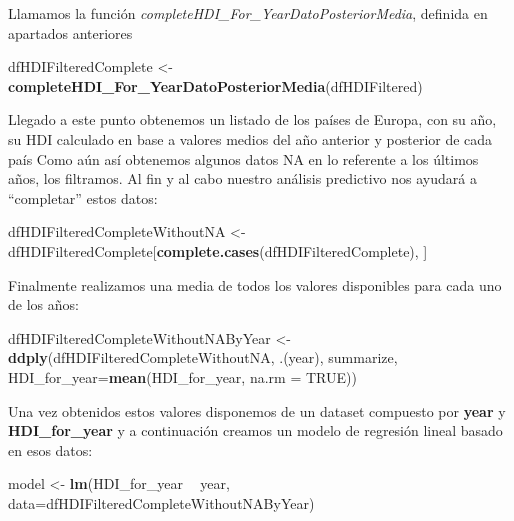 \documentclass[]{article}
\newenvironment{Shaded}{\begin{snugshade}}{\end{snugshade}}
\newcommand{\DataTypeTok}[1]{\textcolor[rgb]{0.13,0.29,0.53}{#1}}
\newcommand{\KeywordTok}[1]{\textcolor[rgb]{0.13,0.29,0.53}{\textbf{#1}}}
\newcommand{\NormalTok}[1]{#1}
\newcommand{\OperatorTok}[1]{\textcolor[rgb]{0.81,0.36,0.00}{\textbf{#1}}}
\newcommand{\OtherTok}[1]{\textcolor[rgb]{0.56,0.35,0.01}{#1}}
\newcommand{\StringTok}[1]{\textcolor[rgb]{0.31,0.60,0.02}{#1}}
\begin{document}
Llamamos la función \emph{completeHDI\_For\_YearDatoPosteriorMedia},
definida en apartados anteriores

\begin{Shaded}
\begin{Highlighting}[]
\NormalTok{dfHDIFilteredComplete <-}\StringTok{ }\KeywordTok{completeHDI_For_YearDatoPosteriorMedia}\NormalTok{(dfHDIFiltered)}
\end{Highlighting}
\end{Shaded}

Llegado a este punto obtenemos un listado de los países de Europa, con
su año, su HDI calculado en base a valores medios del año anterior y
posterior de cada país Como aún así obtenemos algunos datos NA en lo
referente a los últimos años, los ﬁltramos. Al ﬁn y al cabo nuestro
análisis predictivo nos ayudará a ``completar'' estos datos:

\begin{Shaded}
\begin{Highlighting}[]
\NormalTok{dfHDIFilteredCompleteWithoutNA <-}\StringTok{ }\NormalTok{dfHDIFilteredComplete[}\KeywordTok{complete.cases}\NormalTok{(dfHDIFilteredComplete), ]}
\end{Highlighting}
\end{Shaded}

Finalmente realizamos una media de todos los valores disponibles para
cada uno de los años:

\begin{Shaded}
\begin{Highlighting}[]
\NormalTok{dfHDIFilteredCompleteWithoutNAByYear <-}\StringTok{ }\KeywordTok{ddply}\NormalTok{(dfHDIFilteredCompleteWithoutNA, .(year), summarize,  }\DataTypeTok{HDI_for_year=}\KeywordTok{mean}\NormalTok{(HDI_for_year, }\DataTypeTok{na.rm =} \OtherTok{TRUE}\NormalTok{))}
\end{Highlighting}
\end{Shaded}

Una vez obtenidos estos valores disponemos de un dataset compuesto por
\textbf{year} y \textbf{HDI\_for\_year} y a continuación creamos un
modelo de regresión lineal basado en esos datos:

\begin{Shaded}
\begin{Highlighting}[]
\NormalTok{model <-}\StringTok{ }\KeywordTok{lm}\NormalTok{(HDI_for_year }\OperatorTok{~}\StringTok{ }\NormalTok{year, }\DataTypeTok{data=}\NormalTok{dfHDIFilteredCompleteWithoutNAByYear)}
\end{Highlighting}
\end{Shaded}
\end{document}
